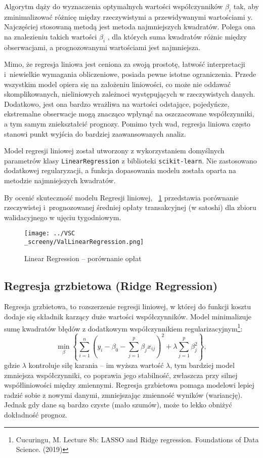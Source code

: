 \documentclass[12pt,a4paper]{report}
\theoremstyle{definition} %
\begin{document}
	Algorytm dąży do wyznaczenia optymalnych wartości współczynników $\beta_i$ tak, aby zminimalizować różnicę między rzeczywistymi a przewidywanymi wartościami y. Najczęściej stosowaną metodą jest metoda najmniejszych kwadratów. Polega ona na znalezieniu takich wartości $\beta_i$ , dla których suma kwadratów różnic między obserwacjami, a 		prognozowanymi wartościami jest najmniejsza.

	Mimo, że regresja liniowa jest ceniona za swoją prostotę, łatwość interpretacji i~niewielkie wymagania obliczeniowe, posiada pewne istotne ograniczenia. Przede wszystkim model opiera się na założeniu liniowości, co może nie oddawać skomplikowanych, nieliniowych zależnoci występujących w rzeczywistych danych. Dodatkowo, jest ona bardzo wrażliwa na wartości odstające, pojedyńcze, ekstremalne obserwacje mogą znacząco wpłynąć na oszczacowane współczynniki, a tym samym zniekształcić prognozy. Pomimo tych wad, regresja liniowa często stanowi punkt wyjścia do bardziej zaawansowanych analiz.

	Model regresji liniowej został utworzony z wykorzystaniem domyślnych parametrów klasy \texttt{LinearRegression} z biblioteki \texttt{scikit-learn}. Nie zastosowano dodatkowej regularyzacji, a funkcja dopasowania modelu została oparta na metodzie najmniejszych kwadratów.

	By ocenić skuteczność modelu Regresji liniowej, \figurename~\ref{fig:wykresLinearRegression} przedstawia porównanie rzeczywistej i~prognozowanej średniej opłaty transakcyjnej (w satoshi) dla zbioru walidacyjnego w ujęciu tygodniowym.	

	\begin{figure}[H]
	    \centering
	    \texttt{[image: ../VSC\\\_screeny/ValLinearRegression.png]} 
	    \caption{Linear Regression – porównanie opłat}
	    \label{fig:wykresLinearRegression}
	\end{figure}

	\subsection{Regresja grzbietowa (Ridge Regression)}
	\hspace*{\parindent}Regresja grzbietowa, to rozszerzenie regresji liniowej, w której do funkcji kosztu dodaje się składnik karzący duże wartości współczynników. Model minimalizuje sumę kwadratów błędów z dodatkowym współczynnikiem regularizacyjnym\footnote{Cucuringu, M. Lecture 8b: LASSO and Ridge regression. Foundations of 	Data Science. (2019)}:
	\[
	\min_{\beta} \left\{ \sum_{i=1}^{n} \left( y_i - \beta_0 - \sum_{j=1}^{p} \beta_j x_{ij} \right)^2 + \lambda \sum_{j=1}^{p} \beta_j^2 \right\},
	\]
	gdzie $\lambda$ kontroluje siłę karania – im wyższa wartość $\lambda$, tym bardziej model zmniejsza współczynniki, co poprawia jego stabilność, zwłaszcza przy silnej współliniowości między zmiennymi. Regresja grzbietowa pomaga modelowi lepiej radzić sobie z nowymi danymi, zmniejszając zmienność wyników (wariancję). Jednak gdy dane są 			bardzo czyste (mało szumów), może to lekko obniżyć dokładność prognoz.
	
\end{document}
